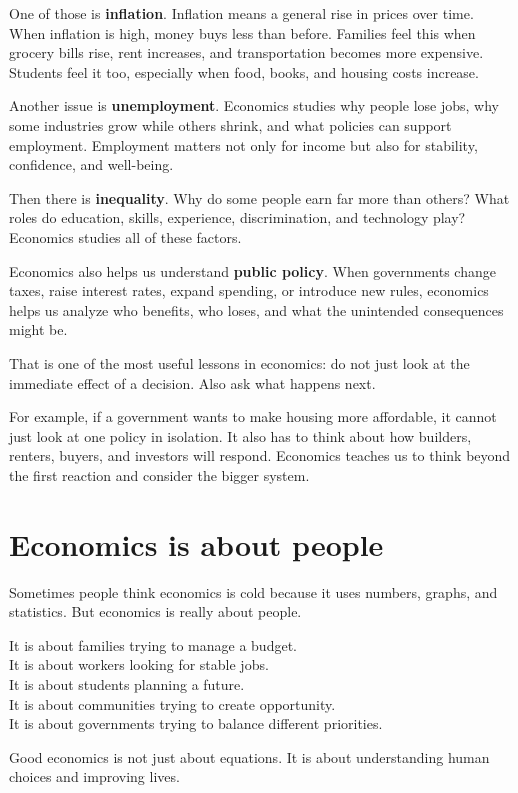 \documentclass[12pt]{article}
\begin{document}
One of those is \textbf{inflation}. Inflation means a general rise in prices over time. When inflation is high, money buys less than before. Families feel this when grocery bills rise, rent increases, and transportation becomes more expensive. Students feel it too, especially when food, books, and housing costs increase.

Another issue is \textbf{unemployment}. Economics studies why people lose jobs, why some industries grow while others shrink, and what policies can support employment. Employment matters not only for income but also for stability, confidence, and well-being.

Then there is \textbf{inequality}. Why do some people earn far more than others? What roles do education, skills, experience, discrimination, and technology play? Economics studies all of these factors.

Economics also helps us understand \textbf{public policy}. When governments change taxes, raise interest rates, expand spending, or introduce new rules, economics helps us analyze who benefits, who loses, and what the unintended consequences might be.

That is one of the most useful lessons in economics: do not just look at the immediate effect of a decision. Also ask what happens next.

For example, if a government wants to make housing more affordable, it cannot just look at one policy in isolation. It also has to think about how builders, renters, buyers, and investors will respond. Economics teaches us to think beyond the first reaction and consider the bigger system.

\section*{Economics is about people}

Sometimes people think economics is cold because it uses numbers, graphs, and statistics. But economics is really about people.

It is about families trying to manage a budget.\\
It is about workers looking for stable jobs.\\
It is about students planning a future.\\
It is about communities trying to create opportunity.\\
It is about governments trying to balance different priorities.

Good economics is not just about equations. It is about understanding human choices and improving lives.
\end{document}
